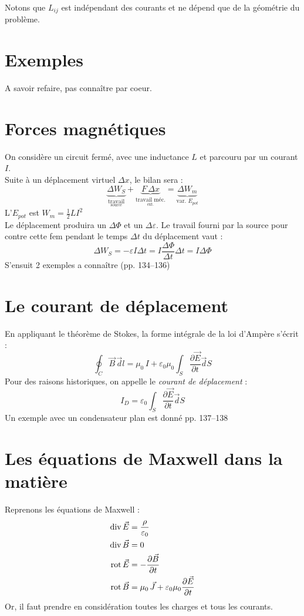 \documentclass[british,french,11pt, a4paper, openany]{book}
\begin{document}
		Notons que $L_{ij}$ est indépendant des courants et ne dépend que de la géométrie du problème. 
		\section{Exemples}
		A savoir refaire, pas connaître par coeur.
		\section{Forces magnétiques}
		On considère un circuit fermé, avec une inductance $L$ et parcouru par un courant $I$.\\Suite à un déplacement virtuel $\Delta x$, le bilan sera : \begin{equation}
		\underbrace{\Delta W_S}_{\underset{\text{source}}{\text{travail}}}+\underbrace{F\,\Delta x}_{\underset{\text{ext.}}{\text{travail méc.}}}=\underbrace{\Delta W_m}_{\text{var. }E_{pot}}
		\end{equation}
		L'$E_{pot}$ est $W_m=\frac{1}{2}LI^2$\\ 
		Le déplacement produira un $\Delta\Phi$ et un $\Delta\varepsilon$. Le travail fourni par la source pour contre cette fem pendant le temps $\Delta t$ du déplacement vaut : \begin{equation}
		\Delta W_S=-\varepsilon I\Delta t=I\frac{\Delta\Phi}{\Delta t}\Delta t=I\Delta\Phi
		\end{equation}
		S'ensuit 2 exemples a connaître (pp. 134--136)
		\section{Le courant de déplacement}
		En appliquant le théorème de Stokes, la forme intégrale de la loi d'Ampère s'écrit :\begin{equation}
		\oint_C\vec B\,\vec dl=\mu_0\,I+\varepsilon_0\mu_0\int_S\frac{\partial\vec E}{\partial t}\vec dS
		\end{equation}
		Pour des raisons historiques, on appelle le \textit{courant de déplacement} :\begin{equation}
		I_D=\varepsilon_0\int_S\frac{\partial\vec E}{\partial t}\vec dS
		\end{equation}
		Un exemple avec un condensateur plan est donné pp. 137--138
		\section{Les équations de Maxwell dans la matière}
		Reprenons les équations de Maxwell : \begin{align}\label{eqmaxwell}
		\text{div}\,\vec E & = \frac{\rho}{\varepsilon_0}\\
		\text{div}\,\vec B & =0\\
		\text{rot}\,\vec E & =-\frac{\partial \vec B}{\partial t}\\
		\label{eqampmax}
		\text{rot}\,\vec B & = \mu_0\,\vec J+\varepsilon_0\mu_0\frac{\partial \vec E}{\partial t}
		\end{align}
		Or, il faut prendre en considération toutes les charges et tous les courants.\\
		
\end{document}
